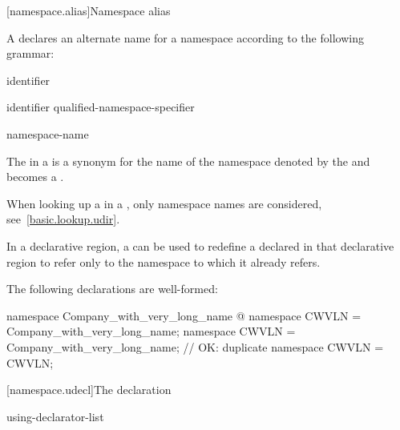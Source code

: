 [namespace.alias]{Namespace alias}%
%
%

\pnum
A  declares an alternate name for a
namespace according to the following grammar:

\begin{bnf}
\br
        identifier
\end{bnf}

\begin{bnf}
\br
         identifier \terminal{=} qualified-namespace-specifier \terminal{;}
\end{bnf}

\begin{bnf}
\br
     namespace-name
\end{bnf}

\pnum
The  in a  is
a synonym for the name of the namespace denoted by the
 and becomes a
.
\begin{note}
When looking up a  in a
, only namespace names are
considered, see~\ref{basic.lookup.udir}.
\end{note}

\pnum
In a declarative region, a  can be
used to redefine a  declared in that
declarative region to refer only to the namespace to which it already
refers.
\begin{example}
The following declarations are well-formed:

\begin{codeblock}
namespace Company_with_very_long_name { @\commentellip@ }
namespace CWVLN = Company_with_very_long_name;
namespace CWVLN = Company_with_very_long_name;  // OK: duplicate
namespace CWVLN = CWVLN;
\end{codeblock}
\end{example}

[namespace.udecl]{The  declaration}%

\begin{bnf}
\br
     using-declarator-list \terminal{;}
\end{bnf}

